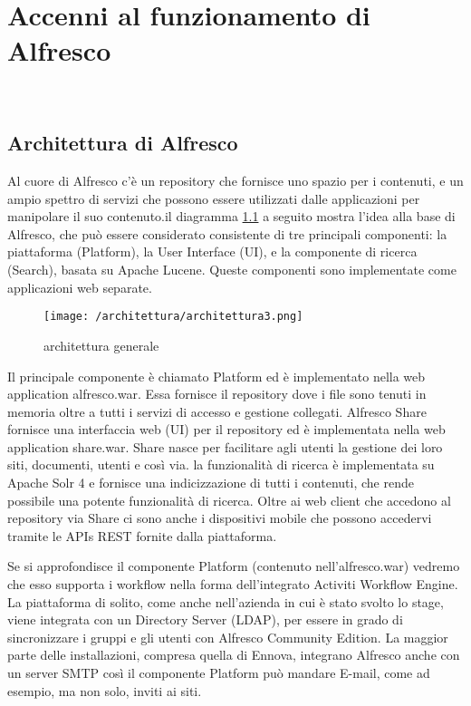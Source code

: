 \chapter{Accenni al funzionamento di Alfresco}
\label{cap:architettura}

\\

\section{Architettura di Alfresco}
Al cuore di Alfresco c'è un repository che fornisce uno spazio per i contenuti, e un ampio spettro di servizi che possono essere utilizzati dalle applicazioni per manipolare il suo contenuto.il diagramma \ref{fig:architettura-generale} a seguito mostra l'idea alla base di Alfresco, che può essere considerato consistente di tre principali componenti: la piattaforma (Platform), la User Interface (UI), e la componente di ricerca (Search), basata su Apache Lucene. Queste componenti sono implementate come applicazioni web separate.
\begin{figure}[!ht]
\centering
\texttt{[image: /architettura/architettura3.png]}
\caption{architettura generale}
\label{fig:architettura-generale}
\end{figure}
Il principale componente è chiamato Platform ed è implementato nella web application alfresco.war. Essa fornisce il repository dove i file sono tenuti in memoria oltre a tutti i servizi di accesso e gestione collegati. Alfresco Share fornisce una interfaccia web (UI) per il repository ed è implementata nella web application share.war. Share nasce per facilitare agli utenti la gestione dei loro siti, documenti, utenti e così via.
la funzionalità di ricerca è implementata su Apache Solr 4 e fornisce una indicizzazione di tutti i contenuti, che rende possibile una potente funzionalità di ricerca. Oltre ai web client che accedono al repository via Share ci sono anche i dispositivi mobile che possono accedervi tramite le APIs REST fornite dalla piattaforma.

Se si approfondisce il componente Platform (contenuto nell'alfresco.war) vedremo che esso supporta i workflow nella forma dell'integrato Activiti Workflow Engine. La piattaforma di solito, come anche nell'azienda in cui è stato svolto lo stage, viene integrata con un Directory Server (LDAP), per essere in grado di sincronizzare i gruppi e gli utenti con Alfresco Community Edition. La maggior parte delle installazioni, compresa quella di Ennova, integrano Alfresco anche con un server SMTP così il componente Platform può mandare E-mail, come ad esempio, ma non solo, inviti ai siti.

